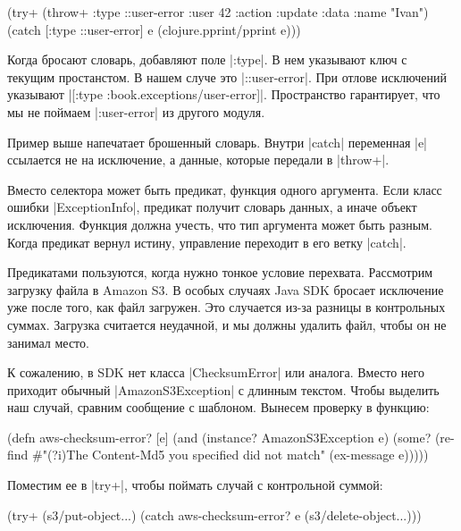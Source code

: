 \begin{english}
  \begin{clojure}
(try+
 (throw+ {:type ::user-error
          :user 42
          :action :update
          :data {:name "Ivan"}})
 (catch [:type ::user-error] e
   (clojure.pprint/pprint e)))
  \end{clojure}
\end{english}

Когда бросают словарь, добавляют поле \spverb|:type|. В нем указывают ключ с
текущим простанстом. В нашем случе это \spverb|::user-error|. При отлове
исключений указывают \spverb|[:type :book.exceptions/user-error]|. Пространство
гарантирует, что мы не поймаем \spverb|:user-error| из другого модуля.

Пример выше напечатает брошенный словарь. Внутри \spverb|catch| переменная
\spverb|e| ссылается не на исключение, а данные, которые передали в
\spverb|throw+|.

Вместо селектора может быть предикат, функция одного аргумента. Если класс
ошибки \spverb|ExceptionInfo|, предикат получит словарь данных, а иначе объект
исключения. Функция должна учесть, что тип аргумента может быть разным. Когда
предикат вернул истину, управление переходит в его ветку \spverb|catch|.

Предикатами пользуются, когда нужно тонкое условие перехвата. Рассмотрим
загрузку файла в Amazon S3. В особых случаях Java SDK бросает исключение уже
после того, как файл загружен. Это случается из-за разницы в контрольных
суммах. Загрузка считается неудачной, и мы должны удалить файл, чтобы он не
занимал место.

К сожалению, в SDK нет класса \spverb|ChecksumError| или аналога. Вместо него
приходит обычный \spverb|AmazonS3Exception| с длинным текстом. Чтобы выделить
наш случай, сравним сообщение с шаблоном. Вынесем проверку в функцию:

\begin{english}
  \begin{clojure}
(defn aws-checksum-error? [e]
  (and (instance? AmazonS3Exception e)
       (some?
        (re-find
         #"(?i)The Content-Md5 you specified did not match"
         (ex-message e)))))
  \end{clojure}
\end{english}

\noindent
Поместим ее в \spverb|try+|, чтобы поймать случай с контрольной суммой:

\begin{english}
  \begin{clojure}
(try+
  (s3/put-object...)
  (catch aws-checksum-error? e
    (s3/delete-object...)))
  \end{clojure}
\end{english}

